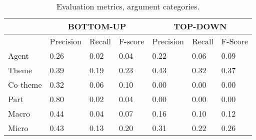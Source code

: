 \begin{table}
\begin{center}
\begin{tabular}{ | l | l | l | l | l | l | l | }	
	\hline
	\cellcolor{gray} & \multicolumn{3}{c}{BOTTOM-UP} & \multicolumn{3}{c|}{TOP-DOWN} \\ \hline
	\cellcolor{gray} & Precision & Recall & F-score & Precision & Recall & F-Score \\ \hline
	Agent & 0.26 & 0.02 & 0.04 & 0.22 & 0.06 & 0.09 \\
	Theme & 0.39 & 0.19 & 0.23 & 0.43 & 0.32 & 0.37 \\
	Co-theme & 0.32 & 0.06 & 0.10 & 0.00 & 0.00 & 0.00 \\
	Part & 0.80 & 0.02 & 0.04 & 0.00 & 0.00 & 0.00  \\ \hline
	Macro & 0.44 & 0.04 & 0.07 & 0.16 & 0.10 & 0.12 \\ 
	Micro & 0.43 & 0.13 & 0.20 & 0.31 & 0.22 & 0.26 \\ \hline
\end{tabular}
\end{center}
\caption{Evaluation metrics, argument categories.}
\label{argument_ev}
\end{table}